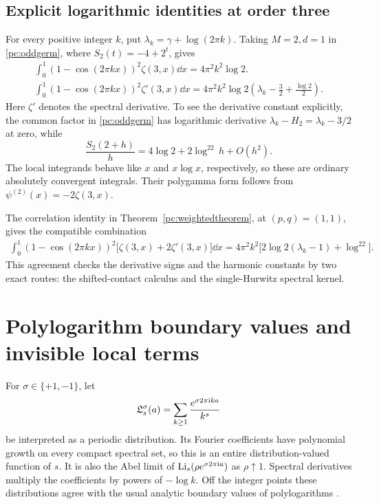\subsection{Explicit logarithmic identities at order three}
For every positive integer $k$, put $\lambda_k=\gamma+\log(2\pi k)$. Taking $M=2,d=1$ in \eqref{pc:oddgerm}, where $S_2(t)=-4+2^t$, gives
\begin{align}
 \boxed{\ \int_0^1(1-\cos(2\pi kx))^2\zeta(3,x)\dd x
       =4\pi^2k^2\log2.\ }\label{pc:zeta3}\\[4pt]
 \boxed{\ \int_0^1(1-\cos(2\pi kx))^2\zeta'(3,x)\dd x
       =4\pi^2k^2\log2
          \left(\lambda_k-\frac32+\frac{\log2}{2}\right).\ }\label{pc:zeta3prime}
\end{align}
Here $\zeta'$ denotes the spectral derivative. To see the derivative constant explicitly, the common factor in \eqref{pc:oddgerm} has logarithmic derivative $\lambda_k-H_2=\lambda_k-3/2$ at zero, while
\[
 \frac{S_2(2+h)}h=4\log2+2\log^22\,h+O(h^2).
\]
The local integrands behave like $x$ and $x\log x$, respectively, so these are ordinary absolutely convergent integrals. Their polygamma form follows from $\psi^{(2)}(x)=-2\zeta(3,x)$.

The correlation identity in Theorem~\ref{pc:weightedtheorem}, at $(p,q)=(1,1)$, gives the compatible combination
\begin{align}\label{pc:correlation3}
 \int_0^1(1-\cos(2\pi kx))^2
       \bigl[\zeta(3,x)+2\zeta'(3,x)\bigr]\dd x
 =4\pi^2k^2\bigl[2\log2(\lambda_k-1)+\log^22\bigr].
\end{align}
This agreement checks the derivative signs and the harmonic constants by two exact routes: the shifted-contact calculus and the single-Hurwitz spectral kernel.

\section{Polylogarithm boundary values and invisible local terms}\label{pc:polylogs}
For $\sigma\in\{+1,-1\}$, let
\begin{equation}\label{pc:periodicLi}
 \mathfrak L_s^\sigma(a)=\sum_{k\ge1}\frac{e^{\sigma2\pi\mathrm{i} ka}}{k^s}
\end{equation}
be interpreted as a periodic distribution. Its Fourier coefficients have polynomial growth on every compact spectral set, so this is an entire distribution-valued function of $s$. It is also the Abel limit of $\operatorname{Li}_s(\rho e^{\sigma2\pi\mathrm{i} a})$ as $\rho\uparrow1$. Spectral derivatives multiply the coefficients by powers of $-\log k$. Off the integer points these distributions agree with the usual analytic boundary values of polylogarithms \cite{rw:DLMFPolylog}.

